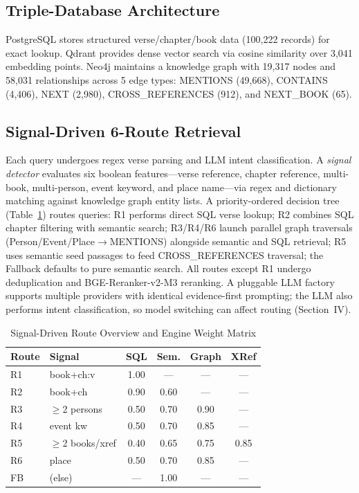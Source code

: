 \documentclass[10pt,conference,letterpaper]{IEEEtran}
\begin{document}
\subsection{Triple-Database Architecture}

PostgreSQL stores structured verse/chapter/book data (100,222 records) for exact lookup. Qdrant provides dense vector search via cosine similarity over 3,041 embedding points. Neo4j maintains a knowledge graph with 19,317 nodes and 58,031 relationships across 5 edge types: MENTIONS (49,668), CONTAINS (4,406), NEXT (2,980), CROSS\_REFERENCES (912), and NEXT\_BOOK (65).

\subsection{Signal-Driven 6-Route Retrieval}

Each query undergoes regex verse parsing and LLM intent classification. A \textit{signal detector} evaluates six boolean features---verse reference, chapter reference, multi-book, multi-person, event keyword, and place name---via regex and dictionary matching against knowledge graph entity lists. A priority-ordered decision tree (Table~\ref{tab:routes}) routes queries: R1 performs direct SQL verse lookup; R2 combines SQL chapter filtering with semantic search; R3/R4/R6 launch parallel graph traversals (Person/Event/Place$\rightarrow$MENTIONS) alongside semantic and SQL retrieval; R5 uses semantic seed passages to feed CROSS\_REFERENCES traversal; the Fallback defaults to pure semantic search. All routes except R1 undergo deduplication and BGE-Reranker-v2-M3 \cite{bge2024} reranking. A pluggable LLM factory supports multiple providers with identical evidence-first prompting; the LLM also performs intent classification, so model switching can affect routing (Section~IV).

\begin{table}[h]
\centering
\caption{Signal-Driven Route Overview and Engine Weight Matrix}
\label{tab:routes}
\footnotesize
\begin{tabular}{@{}llcccc@{}}
\toprule
Route & Signal & SQL & Sem. & Graph & XRef \\
\midrule
R1 & book+ch:v     & 1.00 & ---  & ---  & --- \\
R2 & book+ch       & 0.90 & 0.60 & ---  & --- \\
R3 & $\geq$2 persons  & 0.50 & 0.70 & 0.90 & --- \\
R4 & event kw      & 0.50 & 0.70 & 0.85 & --- \\
R5 & $\geq$2 books/xref & 0.40 & 0.65 & 0.75 & 0.85 \\
R6 & place         & 0.50 & 0.70 & 0.85 & --- \\
FB & (else)        & ---  & 1.00 & ---  & --- \\
\bottomrule
\end{tabular}
\end{table}
\end{document}
